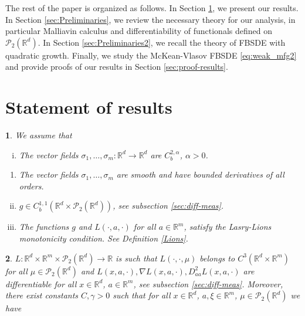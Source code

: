 \documentclass[12,english]{amsart}
\theoremstyle{plain}
\theoremstyle{definition}
\theoremstyle{plain}
\newtheorem{assumption}{\protect\assumptionname}
\theoremstyle{plain}
\theoremstyle{remark}
\providecommand{\assumptionname}{Assumption}
\newcommand{\R}{\mathbb R}
\newcommand{\cP}{\mathcal P}
\newcommand{\ga}{\gamma}
\newcommand{\si}{\sigma}
\begin{document}
The rest of the paper is organized as follows.
In Section \ref{sec:result}, we present our results.
In Section \ref{sec:Preliminaries},
we review the necessary theory for our analysis, in particular Malliavin
calculus and differentiability of functionals defined on $\cP_2(\R^d)$.
In Section \ref{sec:Preliminaries2}, we recall the theory of FBSDE
with quadratic growth. Finally, we study
the McKean-Vlasov FBSDE \eqref{eq:weak_mfg2} and provide proofs of our results in Section \ref{sec:proof-results}.


\section{Statement of results}
\label{sec:result}

\begin{assumption}\label{assu:A0}
  We assume that
  \begin{enumerate}[(i)]
   \item The vector fields $\si_1,\ldots,\si_m: \R^d\to\R^d$ are
     $C^{2,\alpha}_b$, $\alpha>0$.
  \end{enumerate}

\begin{enumerate}[(i')]
  \item  The vector fields $\si_1,\ldots,\si_m$ are smooth and  have
    bounded derivatives of all orders.
\end{enumerate}

 \begin{enumerate}[(i)]
 \setcounter{enumi}{1}

\item  $g\in C^{1,1}_b(\R^d\times\cP_2(\R^d))$, see subsection \ref{sec:diff-meas}.

\item The functions $g$ and $L(\cdot,a,\cdot)$ for all $a\in\R^m$,
  satisfy the Lasry-Lions monotonicity condition. See Definition \ref{Lions}.
\end{enumerate}
\end{assumption}
\begin{assumption}
  \label{assu:A1}
  $L:\R^d\times\R^m\times\cP_2(\R^d)\to\R$ is such that
  $L(\cdot,\cdot,\mu)$ belongs to $C^3(\R^d\times\R^m)$ for all $\mu\in\cP_2(\R^d)$
and $L(x,a,\cdot), \nabla L(x,a,\cdot), D_{aa}^2L(x,a,\cdot)$ are
differentiable for all $x\in\R^d$, $a\in\R^m$, see subsection \ref{sec:diff-meas}.
Moreover,  there exist constants $C,\ga>0$ such that for
all $x\in\R^d$, $a,\xi\in\R^m$, $\mu\in\cP_2(\R^d)$ we have
\end{assumption}
\end{document}
